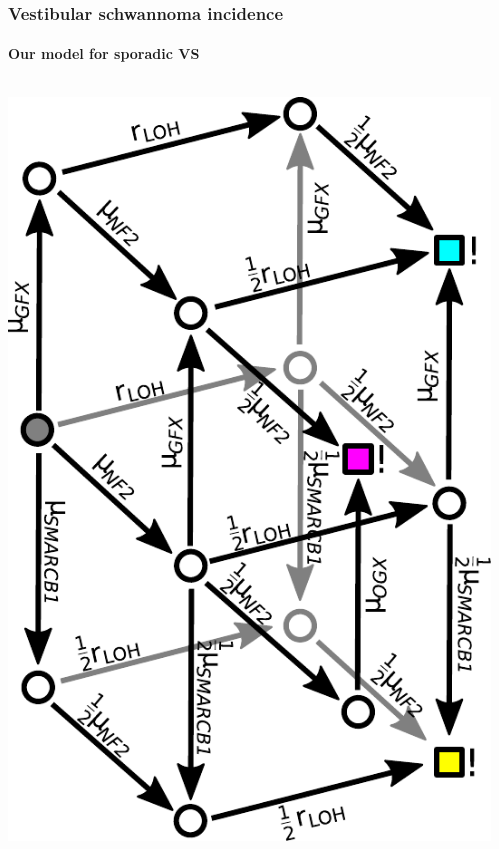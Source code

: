 \documentclass{beamer}
\begin{document}
\begin{frame}
    \frametitle{Vestibular schwannoma incidence}
    \framesubtitle{Our model for sporadic VS}
    \begin{columns}
        \begin{column}{0.5\textwidth}
            \includegraphics[height=0.8\textheight]{figures/vsmodel-nochromosomes.pdf}
        \end{column}
        \begin{column}{0.5\textwidth}
\end{column}
\end{columns}
\end{frame}
\end{document}
